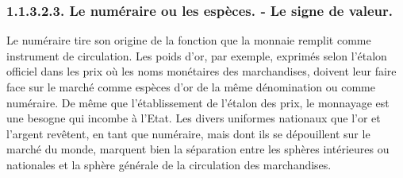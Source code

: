\documentclass[french,twoside]{book} %
\begin{document}
\subsubsection[{1.1.3.2.3. Le numéraire ou les espèces. ‑ Le signe de valeur.}]{1.1.3.2.\textbf{3}. Le numéraire ou les espèces. ‑ Le signe de valeur.}
\noindent Le numéraire tire son origine de la fonction que la monnaie remplit comme instrument de circulation. Les poids d’or, par exemple, exprimés selon l’étalon officiel dans les prix où les noms monétaires des marchandises, doivent leur faire face sur le marché comme espèces d’or de la même dénomination ou comme numéraire. De même que l’établissement de l’étalon des prix, le monnayage est une besogne qui incombe à l’Etat. Les divers uniformes nationaux que l’or et l’argent revêtent, en tant que numéraire, mais dont ils se dépouillent sur le marché du monde, marquent bien la séparation entre les sphères intérieures ou nationales et la sphère générale de la circulation des marchandises.\par
\end{document}
